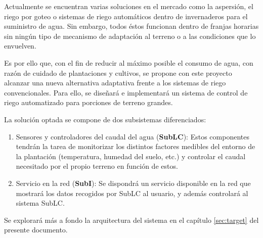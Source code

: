 Actualmente se encuentran varias soluciones en el mercado como la aspersión, el riego por goteo o sistemas de riego automáticos dentro de invernaderos para el suministro de agua. Sin embargo, todos éstos funcionan dentro de franjas horarias sin ningún tipo de mecanismo de adaptación al terreno o a las condiciones que lo envuelven.\newline

Es por ello que, con el fin de reducir al máximo posible el consumo de agua, con razón de cuidado de plantaciones y cultivos, se propone con este proyecto alcanzar una nueva alternativa adaptativa frente a los sistemas de riego convencionales. Para ello, se diseñará e implementará un sistema de control de riego automatizado para porciones de terreno grandes.\newline

La solución optada se compone de dos subsistemas diferenciados:
\begin{enumerate}
    \item Sensores y controladores del caudal del agua ({\bfseries SubLC}): Estos componentes tendrán la tarea de monitorizar los distintos factores medibles del entorno de la plantación (temperatura, humedad del suelo, etc.) y controlar el caudal necesitado por el propio terreno en función de estos.
    \item Servicio en la red ({\bfseries SubI}): Se dispondrá un servicio disponible en la red que mostrará los datos recogidos por SubLC al usuario, y además controlará al sistema SubLC.
\end{enumerate}

Se explorará más a fondo la arquitectura del sistema en el capítulo \ref{sec:target} del presente documento.